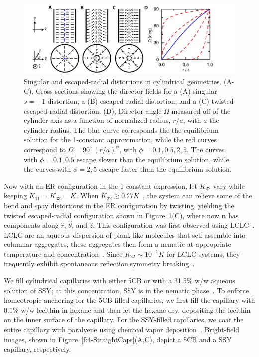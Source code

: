 \begin{figure}
  \centering
  \includegraphics{figures/C4/Ch4-Figs_EscapeSchem.png}
  \caption{Singular and escaped-radial distortions in cylindrical geometries.
  (A-C), Cross-sections showing the director fields for a (A) singular $s = +1$ distortion, a (B) escaped-radial distortion, and a (C) twisted escaped-radial distortion.
  (D), Director angle $\Omega$ measured off of the cylinder axis as a function of normalized radius, $r/a$, with $a$ the cylinder radius. The blue curve corresponds the the equilibrium solution for the 1-constant approximation, while the red curves correspond to $\Omega = 90^{\circ}\,(r/a)^{\phi}$, with $\phi = 0.1,0.5,2,5$.
  The curves with $\phi = 0.1,0.5$ escape slower than the equilibrium solution, while the curves with $\phi = 2, 5$ escape faster than the equilibrium solution.}\label{f:4-EscapeSchem}
\end{figure}

Now with an ER configuration in the 1-constant expression, let $K_{22}$ vary while keeping $K_{11} = K_{33} = K$.
When $K_{22} \gtrsim 0.27K$~\cite{RN192}, the system can relieve some of the bend and spay distortions in the ER configuration by twisting, yielding the twisted escaped-radial configuration shown in Figure~\ref{f:4-EscapeSchem}(C), where now $\mathbf{n}$ has components along $\hat{r}$, $\hat{\theta}$, and $\hat{z}$.
This configuration was first observed using LCLC~\cite{RN192}.
LCLC are an aqueous dispersion of plank-like molecules that self-assemble into columnar aggregates; these aggregates then form a nematic at appropriate temperature and concentration~\cite{RN303}.
Since $K_{22} \sim 10^{-1}K$ for LCLC systems, they frequently exhibit spontaneous reflection symmetry breaking~\cite{RN192,RN191,RN293,RN193,RN302}.

We fill cylindrical capillaries with either 5CB or with a 31.5\% w/w aqueous solution of SSY; at this concentration, SSY is in the nematic phase~\cite{RN303}.
To enforce homeotropic anchoring for the 5CB-filled capillaries, we first fill the capillary with $0.1\%$ w/w lecithin in hexane and then let the hexane dry, depositing the lecithin on the inner surface of the capillary.
For the SSY-filled capillaries, we coat the entire capillary with paralyene using chemical vapor deposition~\cite{RN192}.
Bright-field images, shown in Figure~\ref{f:4-StraightCaps}(A,C), depict a 5CB and a SSY capillary, respectively.


